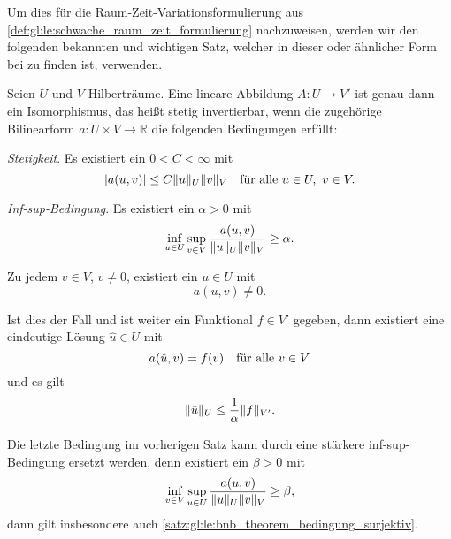 Um dies für die Raum-Zeit-Variationsformulierung aus \cref{def:gl:le:schwache_raum_zeit_formulierung} nachzuweisen, werden wir den folgenden bekannten und wichtigen Satz, welcher in dieser oder ähnlicher Form bei \textcites[Theorem 2.1]{Babuska:1971fx}[Theorem 5.2.1]{Aziz:2014wf}[Theorem \S{}3.3.6]{Braess:2007wm} zu finden ist, verwenden.

\begin{Satz}
\label{satz:gl:le:bnb_theorem}
    Seien $U$ und $V$ Hilberträume.
    Eine lineare Abbildung $A \colon U \to V'$ ist genau dann ein Isomorphismus, das heißt stetig invertierbar, wenn die zugehörige Bilinearform $a \colon U \times V \to \mathbb{R}$ die folgenden Bedingungen erfüllt:
    \begin{thmenumerate}
        \item \label{satz:gl:le:bnb_theorem_bedingung_stetig}
        \emph{Stetigkeit}.
        Es existiert ein $0 < C < \infty$ mit
        \begin{equation}
            \abs{a(u, v)} \leq C \norm{u}_{U} \norm{v}_{V} \quad \fa u \in U,~v\in V.
        \end{equation}
        \item \label{satz:gl:le:bnb_theorem_bedingung_inf_sup}
        \emph{Inf-sup-Bedingung}.
        Es existiert ein $\alpha > 0$ mit
        \begin{equation}
            \inf_{u \in U} \sup_{v \in V} \frac{a(u, v)}{\norm{u}_{U} \norm{v}_{V}} \geq \alpha.
        \end{equation}
        \item \label{satz:gl:le:bnb_theorem_bedingung_surjektiv}
        Zu jedem $v \in V$, $v \neq 0$, existiert ein $u \in U$ mit
        \begin{equation}
            a(u, v) \neq 0.
        \end{equation}
    \end{thmenumerate}
    Ist dies der Fall und ist weiter ein Funktional $f \in V'$ gegeben, dann existiert eine eindeutige Lösung $\hat u \in U$ mit
    \begin{equation}
        a(\hat u, v) = f(v) \quad \fa v \in V
    \end{equation}
    und es gilt
    \begin{equation}
        \norm{\hat u}_{U} \leq \frac{1}{\alpha} \norm{f}_{V'}.
    \end{equation}
\end{Satz}

\begin{Bemerkung}
\label{bem:gl:le:bnb_staerkere_voraussetzungen}
    Die letzte Bedingung im vorherigen Satz kann durch eine stärkere inf-sup-Bedingung ersetzt werden, denn existiert ein $\beta > 0$ mit
    \begin{equation}
        \inf_{v \in V} \sup_{u \in U} \frac{a(u, v)}{\norm{u}_{U} \norm{v}_{V}} \geq \beta,
    \end{equation}
    dann gilt insbesondere auch \ref{satz:gl:le:bnb_theorem_bedingung_surjektiv}.
\end{Bemerkung}

